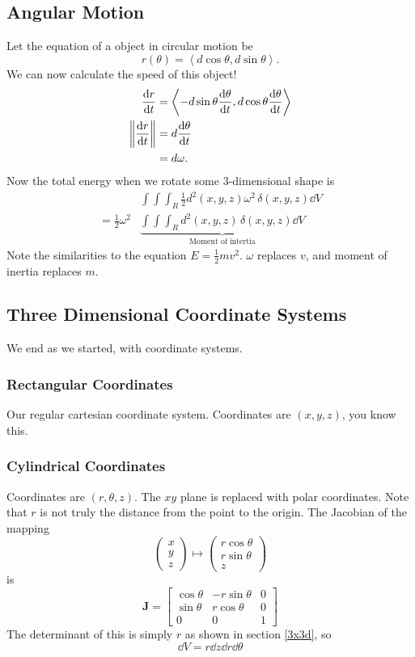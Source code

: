 \documentclass[12pt]{article}
\theoremstyle{plain} %
\theoremstyle{definition}
\theoremstyle{definition}
\theoremstyle{definition}
\theoremstyle{remark}
\newcommand{\half}{\frac{1}{2}}
\newcommand{\angled}[1]{\left\langle {#1} \right\rangle}
\renewcommand{\norm}[1]{\left\lVert#1\right\rVert}
\begin{document}
\subsection{Angular Motion}
Let the equation of a object in circular motion be
\[ r\left(\theta\right) = \angled{d\cos{\theta},d\sin{\theta}}.\]
We can now calculate the speed of this object!
\begin{align*}
    \dv{r}{t} &= \angled{-d\sin{\theta}\dv{\theta}{t},d\cos{\theta}\dv{\theta}{t}}\\
    \norm{\dv{r}{t}} &= d\dv{\theta}{t} \\ &= d\omega.
\end{align*}
Now the total energy when we rotate some $3$-dimensional shape is
\begin{align*}
    &\int\int\int_R \half d^2(x,y,z)\omega^2 \, \delta(x,y,z)\dd{V} \\
    = \half \omega^2 &\underbrace{\int\int\int_R d^2(x,y,z) \, \delta(x,y,z) \dd{V}}_{\text{Moment of intertia}}
\end{align*}
Note the similarities to the equation $E=\half mv^2$. $\omega$ replaces $v$, and moment of inertia replaces $m$.

\subsection{Three Dimensional Coordinate Systems}
We end as we started, with coordinate systems.
\subsubsection{Rectangular Coordinates}
Our regular cartesian coordinate system. Coordinates are $(x,y,z)$, you know this.

\subsubsection{Cylindrical Coordinates}
Coordinates are $(r,\theta,z)$. The $xy$ plane is replaced with polar coordinates. Note that $r$ is not truly the distance from the point to the origin. The Jacobian of the mapping
\[ \begin{pmatrix} x \\ y \\ z \end{pmatrix} \mapsto \begin{pmatrix} r\cos{\theta} \\ r\sin{\theta} \\ z \end{pmatrix} \]
is
\[ \mathbf{J} =
\begin{bmatrix}
    \cos{\theta} & -r\sin{\theta} & 0 \\
    \sin{\theta} & r\cos{\theta} & 0 \\
    0 & 0 & 1
\end{bmatrix} \]
The determinant of this is simply $r$ as shown in section \ref{3x3d}, so
\[ \dd{V} = r \dd{z} \dd{r} \dd{\theta} \]
\end{document}
